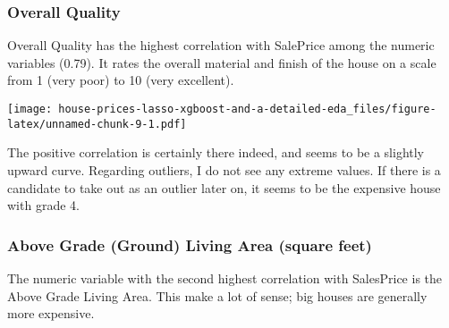 \documentclass[]{article}
\newenvironment{Shaded}{\begin{snugshade}}{\end{snugshade}}
\newcommand{\KeywordTok}[1]{\textcolor[rgb]{0.13,0.29,0.53}{\textbf{#1}}}
\newcommand{\DataTypeTok}[1]{\textcolor[rgb]{0.13,0.29,0.53}{#1}}
\newcommand{\DecValTok}[1]{\textcolor[rgb]{0.00,0.00,0.81}{#1}}
\newcommand{\StringTok}[1]{\textcolor[rgb]{0.31,0.60,0.02}{#1}}
\newcommand{\OperatorTok}[1]{\textcolor[rgb]{0.81,0.36,0.00}{\textbf{#1}}}
\newcommand{\NormalTok}[1]{#1}
\begin{document}
\subsubsection{Overall Quality}\label{overall-quality}

Overall Quality has the highest correlation with SalePrice among the
numeric variables (0.79). It rates the overall material and finish of
the house on a scale from 1 (very poor) to 10 (very excellent).

\begin{Shaded}
\end{Shaded}

\texttt{[image: house-prices-lasso-xgboost-and-a-detailed-eda\_files/figure-latex/unnamed-chunk-9-1.pdf]}

The positive correlation is certainly there indeed, and seems to be a
slightly upward curve. Regarding outliers, I do not see any extreme
values. If there is a candidate to take out as an outlier later on, it
seems to be the expensive house with grade 4.

\subsubsection{Above Grade (Ground) Living Area (square
feet)}\label{above-grade-ground-living-area-square-feet}

The numeric variable with the second highest correlation with SalesPrice
is the Above Grade Living Area. This make a lot of sense; big houses are
generally more expensive.
\end{document}
